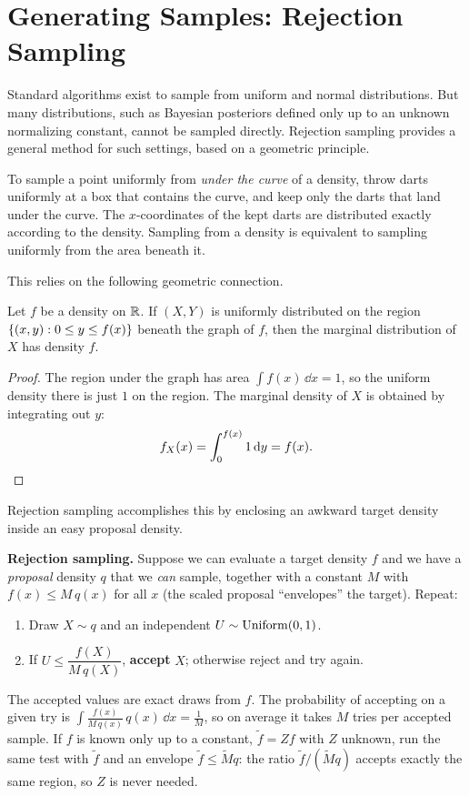 \section{Generating Samples: Rejection Sampling}
\label{ch35:rejection}
Standard algorithms exist to sample from uniform and normal distributions. But many
distributions, such as Bayesian posteriors defined only up to an unknown normalizing
constant, cannot be sampled directly. Rejection sampling
provides a general method for such settings, based on a geometric principle.
\begin{intuitionbox}
To sample a point uniformly from \emph{under the curve} of a density, throw darts
uniformly at a box that contains the curve, and keep only the darts that land
under the curve. The $x$-coordinates of the kept darts are distributed exactly
according to the density. Sampling from a density is equivalent to sampling
uniformly from the area beneath it.
\end{intuitionbox}
This relies on the following geometric connection.
\begin{theorem}
\label{ch35:thm-fts}
Let $f$ be a density on $\mathbb{R}$. If $(X, Y)$ is uniformly distributed on the region
$\{(x,y) : 0 \le y \le f(x)\}$ beneath the graph of $f$, then the marginal
distribution of $X$ has density $f$.
\end{theorem}
\begin{proof}
The region under the graph has area $\int f(x)\,\dd x = 1$, so the uniform
density there is just $1$ on the region. The marginal density of $X$ is obtained
by integrating out $y$:
\[
  f_X(x) = \int_0^{f(x)} 1 \, \mathrm{d} y = f(x). \qedhere
\]
\end{proof}
Rejection sampling accomplishes this by enclosing an awkward target density inside an easy proposal density.
\begin{formalbox}
\textbf{Rejection sampling.} Suppose we can evaluate a target density $f$ and we
have a \emph{proposal} density $q$ that we \emph{can} sample, together with a
constant $M$ with $f(x) \le M\,q(x)$ for all $x$ (the scaled proposal
``envelopes'' the target). Repeat:
\begin{enumerate}
  \item Draw $X \sim q$ and an independent $U \sim \operatorname{Uniform}(0,1)$.
  \item If $U \le \dfrac{f(X)}{M\,q(X)}$, \textbf{accept} $X$; otherwise reject and
        try again.
\end{enumerate}
The accepted values are exact draws from $f$. The probability of accepting on a
given try is $\int \frac{f(x)}{M\,q(x)}\,q(x)\,\dd x = \frac{1}{M}$, so on average it takes $M$ tries per accepted sample.
If $f$ is known only up to a constant, $\tilde f = Z f$ with $Z$ unknown, run the same
test with $\tilde f$ and an envelope $\tilde f \le \tilde M q$: the ratio $\tilde f/(\tilde M q)$
accepts exactly the same region, so $Z$ is never needed.
\end{formalbox}
